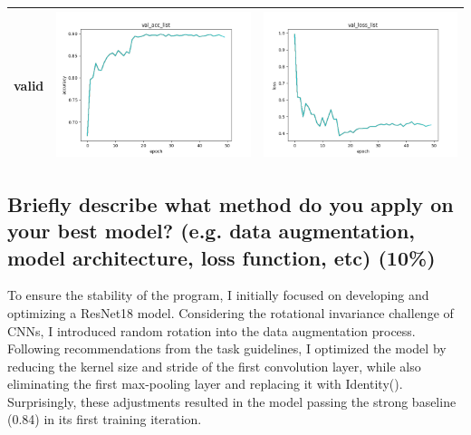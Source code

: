 \documentclass[a4paper, 12pt]{article}
\begin{document}
\begin{table}[!htb]
\begin{tabular}{|c|c|c|}
        valid &\includegraphics[scale=0.5]{p2/experiment/resnet18_2024_04_12_14_05_14_sgd_pre_da/log/val_acc_list.png} & \includegraphics[scale=0.5]{p2/experiment/resnet18_2024_04_12_14_05_14_sgd_pre_da/log/val_loss_list.png} \\
        \hline
    \end{tabular}
\end{table}

\vspace{10em}

\subsection{Briefly describe what method do you apply on your best model? (e.g. data augmentation, model architecture, loss function, etc) (10\%)}
To ensure the stability of the program, I initially focused on developing and optimizing a ResNet18 model.  Considering the rotational invariance challenge of CNNs,  I introduced random rotation into the data augmentation process. Following recommendations from the task guidelines, I optimized the model by reducing the kernel size and stride of the first convolution layer, while also eliminating the first max-pooling layer and replacing it with Identity(). Surprisingly, these adjustments resulted in the model passing the strong baseline (0.84) in its first training iteration.
\end{document}
